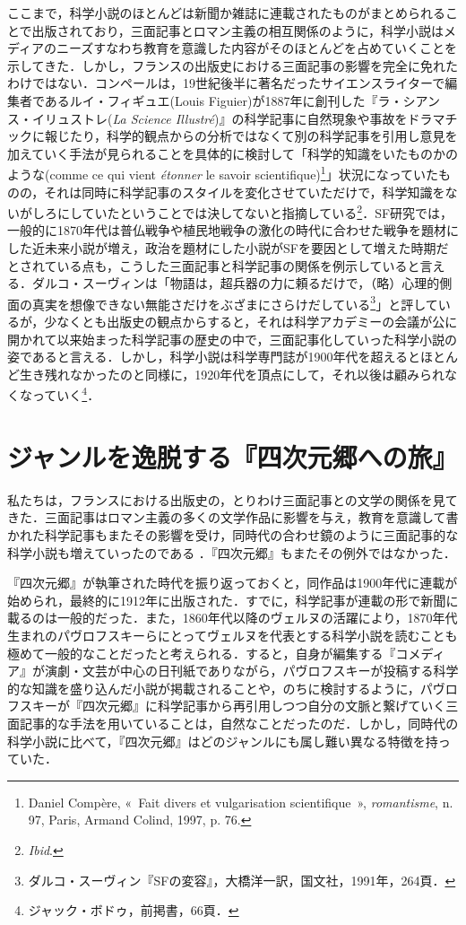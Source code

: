 ここまで，科学小説のほとんどは新聞か雑誌に連載されたものがまとめられることで出版されており，三面記事とロマン主義の相互関係のように，科学小説はメディアのニーズすなわち教育を意識した内容がそのほとんどを占めていくことを示してきた．しかし，フランスの出版史における三面記事の影響を完全に免れたわけではない．コンペールは，19世紀後半に著名だったサイエンスライターで編集者であるルイ・フィギュエ(Louis Figuier)が1887年に創刊した『ラ・シアンス・イリュストレ(\emph{La Science Illustré})』の科学記事に自然現象や事故をドラマチックに報じたり，科学的観点からの分析ではなくて別の科学記事を引用し意見を加えていく手法が見られることを具体的に検討して「科学的知識をいたものかのような(comme ce qui vient \emph{étonner} le savoir scientifique)\footnote{Daniel Compère, «~Fait divers et vulgarisation scientifique~», \emph{romantisme}, n. 97, Paris, Armand Colind, 1997, p. 76.}」状況になっていたものの，それは同時に科学記事のスタイルを変化させていただけで，科学知識をないがしろにしていたということでは決してないと指摘している\footnote{\emph{Ibid}.}．SF研究では，一般的に1870年代は普仏戦争や植民地戦争の激化の時代に合わせた戦争を題材にした近未来小説が増え，政治を題材にした小説がSFを要因として増えた時期だとされている点も，こうした三面記事と科学記事の関係を例示していると言える．ダルコ・スーヴィンは「物語は，超兵器の力に頼るだけで，（略）心理的側面の真実を想像できない無能さだけをぶざまにさらけだしている\footnote{ダルコ・スーヴィン『SFの変容』，大橋洋一訳，国文社，1991年，264頁．}」と評しているが，少なくとも出版史の観点からすると，それは科学アカデミーの会議が公に開かれて以来始まった科学記事の歴史の中で，三面記事化していった科学小説の姿であると言える．しかし，科学小説は科学専門誌が1900年代を超えるとほとんど生き残れなかったのと同様に，1920年代を頂点にして，それ以後は顧みられなくなっていく\footnote{ジャック・ボドゥ，前掲書，66頁．}．

\section{ジャンルを逸脱する『四次元郷への旅』}

私たちは，フランスにおける出版史の，とりわけ三面記事との文学の関係を見てきた．三面記事はロマン主義の多くの文学作品に影響を与え，教育を意識して書かれた科学記事もまたその影響を受け，同時代の合わせ鏡のように三面記事的な科学小説も増えていったのである
．『四次元郷』もまたその例外ではなかった．

『四次元郷』が執筆された時代を振り返っておくと，同作品は1900年代に連載が始められ，最終的に1912年に出版された．すでに，科学記事が連載の形で新聞に載るのは一般的だった．また，1860年代以降のヴェルヌの活躍により，1870年代生まれのパヴロフスキーらにとってヴェルヌを代表とする科学小説を読むことも極めて一般的なことだったと考えられる．すると，自身が編集する『コメディア』が演劇・文芸が中心の日刊紙でありながら，パヴロフスキーが投稿する科学的な知識を盛り込んだ小説が掲載されることや，のちに検討するように，パヴロフスキーが『四次元郷』に科学記事から再引用しつつ自分の文脈と繋げていく三面記事的な手法を用いていることは，自然なことだったのだ．しかし，同時代の科学小説に比べて，『四次元郷』はどのジャンルにも属し難い異なる特徴を持っていた．

